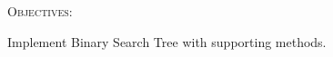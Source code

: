 
\textsc{Objectives:}
\begin{myenum}
\li Implement Binary Search Tree with supporting methods.
\end{myenum}
